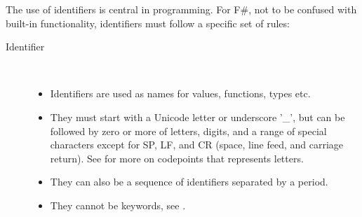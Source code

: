 \documentclass[fsharpnotes.tex]{subfiles}
\begin{document}
The use of identifiers is central in programming. For F\#, not to be confused with built-in functionality, identifiers must follow a specific set of rules: 
\begin{description} 
\item[Identifier]~\\[-5mm]
  \begin{itemize}
  \item Identifiers are used as names for values, functions, types etc.
  \item They must start with a Unicode letter or underscore '\_', but can be followed by zero or more of letters, digits, and a range of special characters except for SP, LF, and CR (space, line feed, and carriage return). See  for more on codepoints that represents letters. 
  \item They can also be a sequence of identifiers separated by a period.
  \item They cannot be keywords, see .
  \end{itemize}
\end{description}
\end{document}
